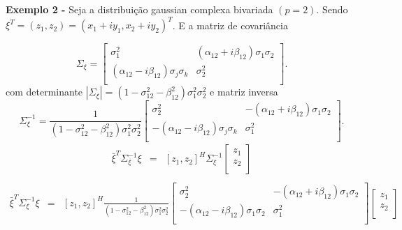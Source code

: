 \documentclass[10pt,a4paper]{article}
\begin{document}
{\bf Exemplo 2 -} Seja a distribuição gaussian complexa bivariada $(p=2)$. Sendo $\xi^{T}=(z_1, z_2)=(x_1 + iy_1, x_2 + iy_2)^{T}$. E a matriz de covariância 

$$
\Sigma_{\xi} = \left[
\begin{array}{cc}
	\sigma_1^2                                &  (\alpha_{12}+i\beta_{12})\sigma_1\sigma_2  \\
	(\alpha_{12}-i\beta_{12})\sigma_j\sigma_k & \sigma_2^2 \\
\end{array}
\right].
$$
com determinante $|\Sigma_{\xi}|=(1 - \sigma_{12}^{2}- \beta_{12}^2)\sigma_{1}^2\sigma_{2}^2$ e  matriz inversa 
$$
\Sigma_{\xi}^{-1} =\frac{1}{(1 - \sigma_{12}^{2}- \beta_{12}^2)\sigma_{1}^2\sigma_{2}^2} \left[
\begin{array}{cc}
	\sigma_2^2                                &  -(\alpha_{12}+i\beta_{12})\sigma_1\sigma_2  \\
	-(\alpha_{12}-i\beta_{12})\sigma_j\sigma_k & \sigma_1^2 \\
\end{array}
\right].
$$
\begin{equation}\label{sec2eqn4}
\begin{array}{ccc}
	\bar{\xi}^{T}\Sigma_{\xi}^{-1}\xi&=&[z_1,z_2]^{H}\Sigma_{\xi}^{-1}
	\left[
\begin{array}{c}
	z_1  \\
	z_2 \\
\end{array}\right]\\
\end{array}
\end{equation}
\begin{equation}\label{sec2eqn5}
\begin{array}{ccc}
	\bar{\xi}^{T}\Sigma_{\xi}^{-1}\xi&=&[z_1,z_2]^{H}\frac{1}{(1 - \sigma_{12}^{2}- \beta_{12}^2)\sigma_{1}^2\sigma_{2}^2} \left[
\begin{array}{cc}
	\sigma_2^2                                &  -(\alpha_{12}+i\beta_{12})\sigma_1\sigma_2  \\
	-(\alpha_{12}-i\beta_{12})\sigma_1\sigma_2 & \sigma_1^2 \\
\end{array}
\right]
	\left[
\begin{array}{c}
	z_1  \\
	z_2 \\
\end{array}\right]\\
\end{array}
\end{equation}
\end{document}
